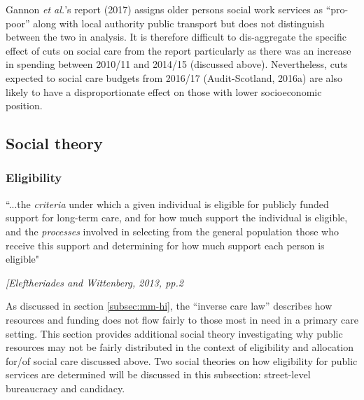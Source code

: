 \documentclass[12pt,a4paper,oneside,table]{report}
\begin{document}
Gannon \textit{et al.}'s report (2017) assigns older persons social work
services as ``pro-poor'' along with local authority public transport but
does not distinguish between the two in analysis. It is therefore
difficult to dis-aggregate the specific effect of cuts on social care
from the report particularly as there was an increase in spending
between 2010/11 and 2014/15 (discussed above). Nevertheless, cuts
expected to social care budgets from 2016/17 (Audit-Scotland, 2016a) are
also likely to have a disproportionate effect on those with lower
socioeconomic position.

\subsection{Social theory}\label{subsec:soc-theory}

\subsubsection{Eligibility}\label{subsubsec:eligibility}

\setlength{\epigraphwidth}{0.8\textwidth}
\epigraph{``...the \textit{criteria} under which a given individual is eligible for publicly funded support for long-term care, and for how much support the individual is eligible, and the \textit{processes} involved in selecting from the general population those who receive this support and determining for how much support each person is eligible"}{\textit{[Eleftheriades and Wittenberg, 2013, pp.2}}

As discussed in section \ref{subsec:mm-hi}, the ``inverse care law''
describes how resources and funding does not flow fairly to those most
in need in a primary care setting. This section provides additional
social theory investigating why public resources may not be fairly
distributed in the context of eligibility and allocation for/of social
care discussed above. Two social theories on how eligibility for public
services are determined will be discussed in this subsection:
street-level bureaucracy and candidacy.
\end{document}
